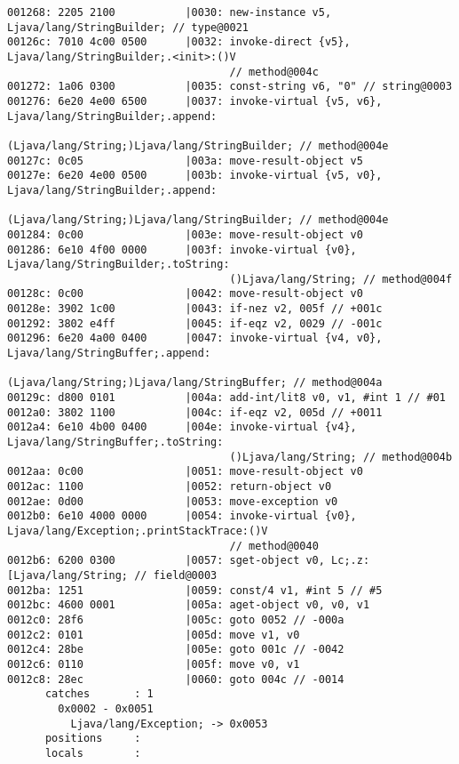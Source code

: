 \begin{lstlisting}
001268: 2205 2100           |0030: new-instance v5, Ljava/lang/StringBuilder; // type@0021
00126c: 7010 4c00 0500      |0032: invoke-direct {v5}, Ljava/lang/StringBuilder;.<init>:()V
                                   // method@004c
001272: 1a06 0300           |0035: const-string v6, "0" // string@0003
001276: 6e20 4e00 6500      |0037: invoke-virtual {v5, v6}, Ljava/lang/StringBuilder;.append:
                                   (Ljava/lang/String;)Ljava/lang/StringBuilder; // method@004e
00127c: 0c05                |003a: move-result-object v5
00127e: 6e20 4e00 0500      |003b: invoke-virtual {v5, v0}, Ljava/lang/StringBuilder;.append:
                                   (Ljava/lang/String;)Ljava/lang/StringBuilder; // method@004e
001284: 0c00                |003e: move-result-object v0
001286: 6e10 4f00 0000      |003f: invoke-virtual {v0}, Ljava/lang/StringBuilder;.toString:
                                   ()Ljava/lang/String; // method@004f
00128c: 0c00                |0042: move-result-object v0
00128e: 3902 1c00           |0043: if-nez v2, 005f // +001c
001292: 3802 e4ff           |0045: if-eqz v2, 0029 // -001c
001296: 6e20 4a00 0400      |0047: invoke-virtual {v4, v0}, Ljava/lang/StringBuffer;.append:
                                   (Ljava/lang/String;)Ljava/lang/StringBuffer; // method@004a
00129c: d800 0101           |004a: add-int/lit8 v0, v1, #int 1 // #01
0012a0: 3802 1100           |004c: if-eqz v2, 005d // +0011
0012a4: 6e10 4b00 0400      |004e: invoke-virtual {v4}, Ljava/lang/StringBuffer;.toString:
                                   ()Ljava/lang/String; // method@004b
0012aa: 0c00                |0051: move-result-object v0
0012ac: 1100                |0052: return-object v0
0012ae: 0d00                |0053: move-exception v0
0012b0: 6e10 4000 0000      |0054: invoke-virtual {v0}, Ljava/lang/Exception;.printStackTrace:()V
                                   // method@0040
0012b6: 6200 0300           |0057: sget-object v0, Lc;.z:[Ljava/lang/String; // field@0003
0012ba: 1251                |0059: const/4 v1, #int 5 // #5
0012bc: 4600 0001           |005a: aget-object v0, v0, v1
0012c0: 28f6                |005c: goto 0052 // -000a
0012c2: 0101                |005d: move v1, v0
0012c4: 28be                |005e: goto 001c // -0042
0012c6: 0110                |005f: move v0, v1
0012c8: 28ec                |0060: goto 004c // -0014
      catches       : 1
        0x0002 - 0x0051
          Ljava/lang/Exception; -> 0x0053
      positions     :
      locals        :


\end{lstlisting}
